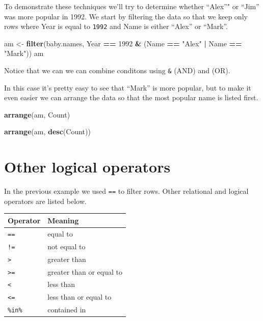 \documentclass[]{book}
\newenvironment{Shaded}{\begin{snugshade}}{\end{snugshade}}
\newcommand{\KeywordTok}[1]{\textcolor[rgb]{0.13,0.29,0.53}{\textbf{#1}}}
\newcommand{\DecValTok}[1]{\textcolor[rgb]{0.00,0.00,0.81}{#1}}
\newcommand{\StringTok}[1]{\textcolor[rgb]{0.31,0.60,0.02}{#1}}
\newcommand{\OperatorTok}[1]{\textcolor[rgb]{0.81,0.36,0.00}{\textbf{#1}}}
\newcommand{\NormalTok}[1]{#1}
\begin{document}
To demonstrate these techniques we'll try to determine whether ``Alex''"
or ``Jim'' was more popular in 1992. We start by filtering the data so
that we keep only rows where Year is equal to \texttt{1992} and Name is
either ``Alex'' or ``Mark''.

\begin{Shaded}
\begin{Highlighting}[]
\NormalTok{am <-}\StringTok{ }\KeywordTok{filter}\NormalTok{(baby.names, }
\NormalTok{             Year }\OperatorTok{==}\StringTok{ }\DecValTok{1992} \OperatorTok{&}\StringTok{ }\NormalTok{(Name }\OperatorTok{==}\StringTok{ "Alex"} \OperatorTok{|}\StringTok{ }\NormalTok{Name }\OperatorTok{==}\StringTok{ "Mark"}\NormalTok{))}
\NormalTok{am}
\end{Highlighting}
\end{Shaded}

Notice that we can we can combine conditons using \texttt{\&} (AND) and
\texttt{\textbar{}} (OR).

In this case it's pretty easy to see that ``Mark'' is more popular, but
to make it even easier we can arrange the data so that the most popular
name is listed first.

\begin{Shaded}
\begin{Highlighting}[]
\KeywordTok{arrange}\NormalTok{(am, Count)}
\end{Highlighting}
\end{Shaded}

\begin{Shaded}
\begin{Highlighting}[]
\KeywordTok{arrange}\NormalTok{(am, }\KeywordTok{desc}\NormalTok{(Count))}
\end{Highlighting}
\end{Shaded}

\section{Other logical operators}\label{other-logical-operators}

In the previous example we used \texttt{==} to filter rows. Other
relational and logical operators are listed below.

\begin{longtable}[]{@{}ll@{}}
\toprule
Operator & Meaning\tabularnewline
\midrule
\endhead
\texttt{==} & equal to\tabularnewline
\texttt{!=} & not equal to\tabularnewline
\texttt{\textgreater{}} & greater than\tabularnewline
\texttt{\textgreater{}=} & greater than or equal to\tabularnewline
\texttt{\textless{}} & less than\tabularnewline
\texttt{\textless{}=} & less than or equal to\tabularnewline
\texttt{\%in\%} & contained in\tabularnewline
\bottomrule
\end{longtable}
\end{document}
